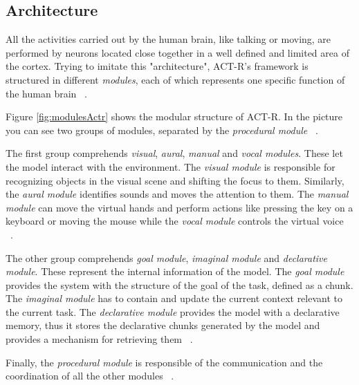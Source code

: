 	\subsection{Architecture}
	All the activities carried out by the human brain, like talking or moving, are performed by neurons located close together in a well defined and limited area of the cortex. Trying to imitate this "architecture", \mbox{ACT-R's} framework is structured in different \emph{modules}, each of which represents one specific function of the human brain ~\cite{actr6refman}. 
	
	Figure \ref{fig:modulesActr} shows the modular structure of ACT-R. In the picture you can see two groups of modules, separated by the \emph{procedural module} ~\cite{actr6refman}. 
	
	The first group comprehends \emph{visual}, \emph{aural}, \emph{manual } and \emph{vocal modules}. These let the model interact with the environment.
	The \emph{visual module} is responsible for recognizing objects in the visual scene and shifting the focus to them. Similarly, the \emph{aural module} identifies sounds and moves the attention to them. 
	The \emph{manual module} can move the virtual hands and perform actions like pressing the key on a keyboard or moving the mouse while the \emph{vocal module} controls the virtual voice ~\cite{actr6refman}.
	
	The other group comprehends \emph{goal module}, \emph{imaginal module} and \emph{declarative module}. These represent the internal information of the model.  
	The \emph{goal module} provides the system with the structure of the goal of the task, defined as a chunk. 
	The \emph{imaginal module} has to contain and update the current context relevant to the current task. 
	The \emph{declarative module} provides the model with a declarative memory, thus it stores the declarative chunks generated by the model and provides a mechanism for retrieving them ~\cite{actr6refman}. 
	
	Finally, the \emph{procedural module} is responsible of the communication and the coordination of all the other modules ~\cite{actr6refman}. 
	
